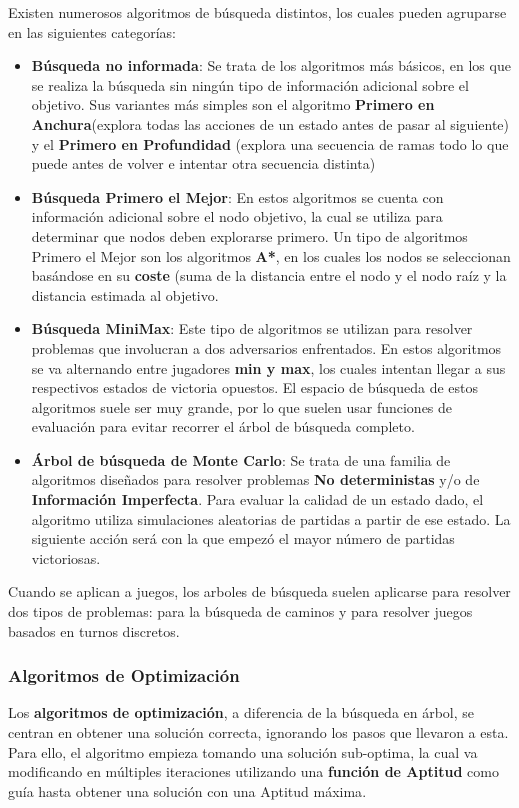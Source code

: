 Existen numerosos algoritmos de búsqueda distintos, los cuales pueden agruparse en las siguientes categorías:
\begin{itemize}
\item \textbf{Búsqueda no informada}: Se trata de los algoritmos más básicos, en los que se realiza la búsqueda sin ningún tipo de información adicional sobre el objetivo. Sus variantes más simples son el algoritmo \textbf{Primero en Anchura}(explora todas las acciones de un estado antes de pasar al siguiente) y el \textbf{Primero en Profundidad} (explora una secuencia de ramas todo lo que puede antes de volver e intentar otra secuencia distinta)
\item \textbf{Búsqueda Primero el Mejor}: En estos algoritmos se cuenta con información adicional sobre el nodo objetivo, la cual se utiliza para determinar que nodos deben explorarse primero. Un tipo de algoritmos Primero el Mejor son los algoritmos \textbf{A*}, en los cuales los nodos se seleccionan basándose en su \textbf{coste} (suma de la distancia entre el nodo y el nodo raíz y la distancia estimada al objetivo.
\item \textbf{Búsqueda MiniMax}: Este tipo de algoritmos se utilizan para resolver problemas que involucran a dos adversarios enfrentados. En estos algoritmos se va alternando entre jugadores \textbf{min y max}, los cuales intentan llegar a sus respectivos estados de victoria opuestos. El espacio de búsqueda de estos algoritmos suele ser muy grande, por lo que suelen usar funciones de evaluación para evitar recorrer el árbol de búsqueda completo.
\item \textbf{Árbol de búsqueda de Monte Carlo}: Se trata de una familia de algoritmos diseñados para resolver problemas \textbf{No deterministas} y/o de \textbf{Información Imperfecta}. Para evaluar la calidad de un estado dado, el algoritmo utiliza simulaciones aleatorias de partidas a partir de ese estado. La siguiente acción será con la que empezó el mayor número de partidas victoriosas.
\end{itemize} 

Cuando se aplican a juegos, los arboles de búsqueda suelen aplicarse para resolver dos tipos de problemas: para la búsqueda de caminos y para resolver juegos basados en turnos discretos.

\subsubsection{Algoritmos de Optimización}
Los \textbf{algoritmos de optimización}, a diferencia de la búsqueda en árbol, se centran en obtener una solución correcta, ignorando los pasos que llevaron a esta. Para ello, el algoritmo empieza tomando una solución sub-optima, la cual va modificando en múltiples iteraciones utilizando una \textbf{función de Aptitud} como guía hasta obtener una solución con una Aptitud máxima\cite{ai_and_games}.

